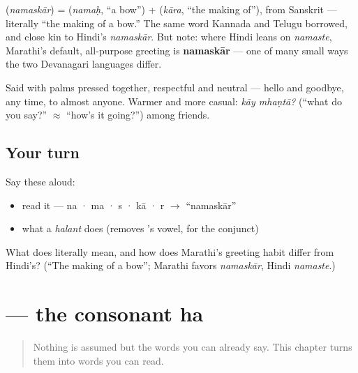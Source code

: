 \begin{cousinweb}
\textbf{} (\emph{namaskār}) = \textbf{} (\emph{namaḥ}, \textquotedblleft{}a bow\textquotedblright{}) + \textbf{} (\emph{kāra}, \textquotedblleft{}the making of\textquotedblright{}), from Sanskrit — literally \textquotedblleft{}the making of a bow.\textquotedblright{} The same word Kannada and Telugu borrowed, and close kin to Hindi's \emph{namaskār}. But note: where Hindi leans on \emph{namaste}, Marathi's default, all-purpose greeting is \textbf{namaskār} — one of many small ways the two Devanagari languages differ.
\end{cousinweb}

\begin{culture}
Said with palms pressed together, respectful and neutral — hello and goodbye, any time, to almost anyone. Warmer and more casual: \emph{kāy mhaṇtā?} (\textquotedblleft{}what do you say?\textquotedblright{} $\approx$ \textquotedblleft{}how's it going?\textquotedblright{}) among friends.
\end{culture}

\subsection*{Your turn}
Say these aloud:

\begin{itemize}
\raggedright
  \item read it — na · ma · s · kā · r $\to$ \textquotedblleft{}namaskār\textquotedblright{}
  \item what a \emph{halant} does (removes 's vowel, for the  conjunct)
\end{itemize}

\begin{tcolorbox}[breakable,colback=teal!4,colframe=teal!35!black,title={Before you move on}]
What does \textbf{} literally mean, and how does Marathi's greeting habit differ from Hindi's? (\textquotedblleft{}The making of a bow\textquotedblright{}; Marathi favors \emph{namaskār}, Hindi \emph{namaste}.)
\end{tcolorbox}
\section[ha]{ — the consonant ha}

\label{lesson:MR-W01-ha}



\begin{quote}
Nothing is assumed but the words you can already say. This chapter turns them into words you can read.
\end{quote}

